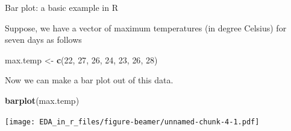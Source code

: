 \documentclass[ignorenonframetext,]{beamer}
\newenvironment{Shaded}{\begin{snugshade}}{\end{snugshade}}
\newcommand{\KeywordTok}[1]{\textcolor[rgb]{0.13,0.29,0.53}{\textbf{#1}}}
\newcommand{\DecValTok}[1]{\textcolor[rgb]{0.00,0.00,0.81}{#1}}
\newcommand{\StringTok}[1]{\textcolor[rgb]{0.31,0.60,0.02}{#1}}
\newcommand{\NormalTok}[1]{#1}
\begin{document}
\begin{frame}[fragile]{Bar plot: a basic example in R}

Suppose, we have a vector of maximum temperatures (in degree Celsius)
for seven days as follows

\begin{Shaded}
\begin{Highlighting}[]
\NormalTok{max.temp <-}\StringTok{ }\KeywordTok{c}\NormalTok{(}\DecValTok{22}\NormalTok{, }\DecValTok{27}\NormalTok{, }\DecValTok{26}\NormalTok{, }\DecValTok{24}\NormalTok{, }\DecValTok{23}\NormalTok{, }\DecValTok{26}\NormalTok{, }\DecValTok{28}\NormalTok{)}
\end{Highlighting}
\end{Shaded}

Now we can make a bar plot out of this data.

\begin{Shaded}
\begin{Highlighting}[]
\KeywordTok{barplot}\NormalTok{(max.temp)}
\end{Highlighting}
\end{Shaded}

\texttt{[image: EDA\_in\_r\_files/figure-beamer/unnamed-chunk-4-1.pdf]}

\end{frame}
\end{document}
